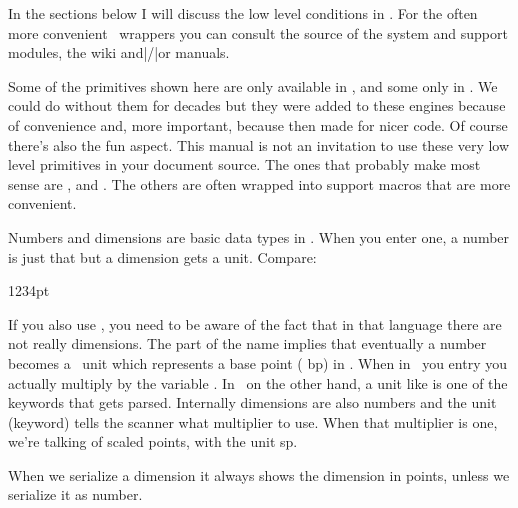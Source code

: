 In the sections below I will discuss the low level conditions in \TEX. For the
often more convenient \CONTEXT\ wrappers you can consult the source of the system
and support modules, the wiki and|/|or manuals.

Some of the primitives shown here are only available in \LUATEX, and some only in
\LUAMETATEX . We could do without them for decades but they were added to these
engines because of convenience and, more important, because then made for nicer
code. Of course there's also the fun aspect. This manual is not an invitation to
use these very low level primitives in your document source. The ones that
probably make most sense are \type {\ifnum}, \type {\ifdim} and \type {\ifcase}.
The others are often wrapped into support macros that are more convenient.

\stopsectionlevel

\startsectionlevel[title={Number and dimensions}]

Numbers and dimensions are basic data types in \TEX. When you enter one, a number
is just that but a dimension gets a unit. Compare:

1234pt
\stoptyping

If you also use \METAPOST, you need to be aware of the fact that in that language
there are not really dimensions. The  part of the name implies that
eventually a number becomes a \POSTSCRIPT\ unit which represents a base point (\type
{bp}) in \TEX. When in \METAPOST\ you entry \type {1234pt} you actually multiply
 by the variable . In \TEX\ on the other hand, a unit like
 is one of the keywords that gets parsed. Internally dimensions are
also numbers and the unit (keyword) tells the scanner what multiplier to use.
When that multiplier is one, we're talking of scaled points, with the unit \type
{sp}.

\startbuffer
\the\dimexpr 12.34pt \relax
\the\dimexpr 12.34sp \relax
\the\dimexpr 12.99sp \relax
\the\dimexpr 1234sp  \relax
\the{}    \relax
\stopbuffer

\typebuffer[option=TEX]

\startlines \getbuffer \stoplines

When we serialize a dimension it always shows the dimension in points, unless we
serialize it as number.

\startbuffer
{}
\number\scratchdimen
\the\scratchdimen
\stopbuffer

\typebuffer[option=TEX]

